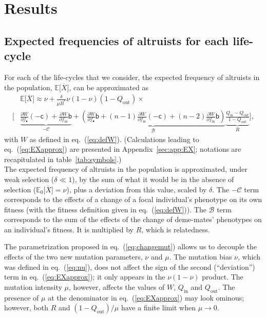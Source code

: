 \documentclass[11pt, letterpaper]{article}
\renewcommand{\eqref}[1]{\textup{{\normalfont eq.~(\ref{#1}}\normalfont)}}
\newcommand{\derivn}[2]{\frac{\partial #1}{\partial #2}}
\newcommand{\Esp}[1]{\mathbb{E}\big[ #1\big]}%
\newcommand{\Espzero}[1]{\mathbb{E}_0\big[ #1\big]}%
\newcommand{\appname}[0]{Appendix}
\newcommand{\bb}{\mathsf{b}}
\newcommand{\cc}{\mathsf{c}}
\newcommand{\mutbias}{\nu}
\newcommand{\inn}{\textrm{in}}
\newcommand{\out}{\textrm{out}}
\newcommand{\focal}{\bullet}
\newcommand{\Qin}{Q_{\inn}}
\newcommand{\Qout}{Q_{\out}}
\newcommand{\selstr}{\delta}
\begin{document}
\section*{Results}


\subsection*{Expected frequencies of altruists for each life-cycle}

For each of the life-cycles that we consider, the expected frequency of altruists in the population, $\Esp{\overline{X}}$, can be approximated as
\begin{equation}\label{eq:EXapprox}
\begin{split}
& \Esp{\overline{X}} \approx \mutbias + 
\frac{\selstr}{\mu B^*}  \mutbias (1-\mutbias) (1 - Q_{\out}) \times \\
 \Bigg[ &\underbrace{ \derivn{W}{f_{\focal}} (-\cc) + \derivn{W}{f_{\inn}} \bb}_{-\mathcal{C}} + \underbrace{ \left( \derivn{W}{f_{\focal}} \bb + (n-1) \derivn{W}{f_{\inn}} (-\cc) + (n-2) \derivn{W}{f_{\inn}} \bb \right) }_{\mathcal{B}} \underbrace{\frac{Q_{\inn} - Q_{\out}}{1 - Q_{\out}}}_{R} \Bigg],
\end{split}
\end{equation}
%
with $W$ as defined in \eqref{eq:defW}. (Calculations leading to \eqref{eq:EXapprox} are presented in  \appname~\ref{sec:app:EX}; notations are recapitulated in table~\ref{tab:symbols}.)\\ The expected frequency of altruists in the population is approximated, under weak selection ($\selstr \ll 1$), by the sum of what it would be in the absence of selection ($\Espzero{\overline{X}} =\mutbias$), plus a deviation from this value, scaled by $\selstr$. The $-\mathcal{C}$ term corresponds to the effects of a change of a focal individual's phenotype on its own fitness (with the fitness definition given in \eqref{eq:defW}). The $\mathcal{B}$ term corresponds to the sum of the effects of the change of deme-mates' phenotypes on an individual's fitness. It is multiplied by $R$, which is relatedness. 

The parametrization proposed in \eqref{eq:changemut} allows us to decouple the effects of the two new mutation parameters, $\mutbias$ and $\mu$. The mutation bias $\mutbias$, which was defined in \eqref{eq:nu}, does not affect the sign of the second (``deviation'') term in \eqref{eq:EXapprox}; it only appears in the $\mutbias (1-\mutbias)$ product. The mutation intensity $\mu$, however, affects the values of $W$, $\Qin$ and $\Qout$. The presence of $\mu$ at the denominator in \eqref{eq:EXapprox} may look ominous; however, both $R$ and $(1-\Qout)/\mu$ have a finite limit when $\mu \to 0$. 
\end{document}
